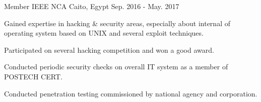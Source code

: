 \begin{cventries}
  \cventry
    {Member} %
    {IEEE NCA} %
    {Caito, Egypt} %
    {Sep. 2016 - May. 2017} %
    {
      \begin{cvitems} %
        \item {Gained expertise in hacking \& security areas, especially about internal of operating system based on UNIX and several exploit techniques.}
        \item {Participated on several hacking competition and won a good award.}
        \item {Conducted periodic security checks on overall IT system as a member of POSTECH CERT.}
        \item {Conducted penetration testing commissioned by national agency and corporation.}
      \end{cvitems}
    }

\end{cventries}
